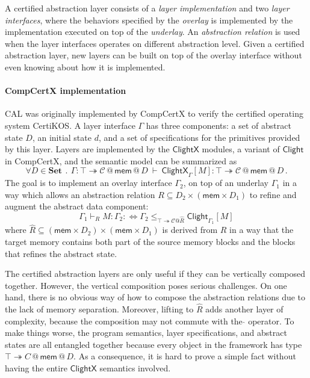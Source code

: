\documentclass[acmsmall,screen,review,anonymous]{acmart}
\newcommand{\kw}[1]{\ensuremath{ \mathsf{#1} }}
\begin{document}
A certified abstraction layer consists of
a \emph{layer implementation}
and two \emph{layer interfaces},
where
the behaviors specified by the \emph{overlay}
is implemented
by the implementation executed on top of the \emph{underlay}.
An \emph{abstraction relation} is used
when the layer interfaces
operates on different abstraction level.
Given a certified abstraction layer,
new layers can be built on top of the overlay interface
without even knowing about how it is implemented.

\paragraph{CompCertX implementation}
CAL was originally implemented by CompCertX \cite{popl15}
to verify the certified operating system CertiKOS.
A layer interface $\Gamma$ has three components:
a set of abstract state $D$,
an initial state $d$,
and a set of specifications
for the primitives provided by this layer.
Layers are implemented by the $\kw{ClightX}$ modules,
a variant of $\kw{Clight}$ in CompCertX,
and the semantic model can be summarized as
\[
  \forall D \in \mathbf{Set}
  \: \mathbin. \:
  \Gamma :
    \top \twoheadrightarrow
    \mathcal{C} \mathbin@ \kw{mem} \mathbin@ D
  \: \vdash \:
  \kw{ClightX}_{\Gamma}[M] :
    \top \twoheadrightarrow
    \mathcal{C} \mathbin@ \kw{mem} \mathbin@ D
  \,.
\]
The goal is to implement an overlay interface $\Gamma_2$,
on top of an underlay $\Gamma_1$
in a way which allows an abstraction relation
$R \subseteq D_2 \times (\kw{mem} \times D_1)$
to refine and augment the abstract data component:
\[
  \Gamma_1 \vdash_R M : \Gamma_2 :\Leftrightarrow
  \Gamma_2 \le_{\top \twoheadrightarrow \mathcal{C}@\hat{R}}
    \kw{Clight}_{\Gamma_1}[M]
\]
where $\hat{R} \subseteq (\kw{mem} \times D_2) \times (\kw{mem} \times D_1)$
is derived from $R$ in a way that
the target memory contains both
part of the source memory blocks and
the blocks that refines the abstract state.

The certified abstraction layers are only
useful if they can be vertically composed together.
However,
the vertical composition poses serious challenges.
On one hand,
there is no obvious way of
how to compose the abstraction relations
due to the lack of memory separation.
Moreover,
lifting to $\hat{R}$ adds another layer of complexity,
because the composition may not commute with the $\hat{}$ operator.
To make things worse,
the program semantics, layer specifications,
and abstract states are all entangled together
because every object in the framework
has type $\top \twoheadrightarrow C\mathbin@ \kw{mem} \mathbin@ D$.
As a consequence,
it is hard to prove a simple fact without having
the entire $\kw{ClightX}$ semantics involved.
\end{document}

